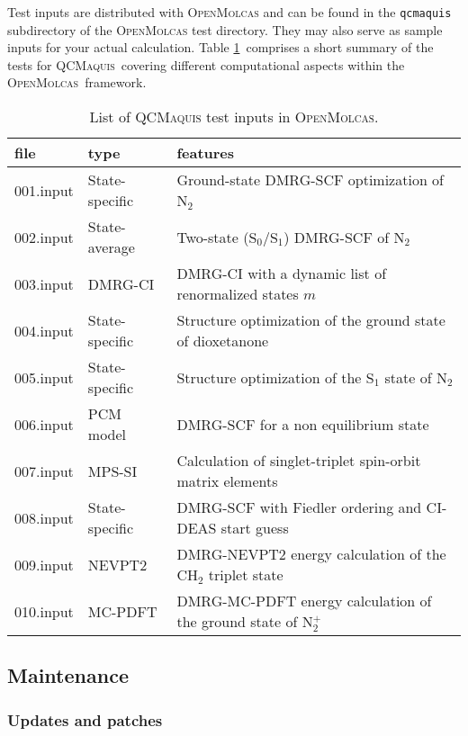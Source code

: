 \documentclass[bibliography=totoc,12pt,a4paper]{scrartcl}
\newcommand{\mol}{\textsc{OpenMolcas}}
\newcommand{\qcm}{\textsc{QCMaquis}}
\begin{document}
\noindent Test inputs are distributed with \mol{} and can be found in the \texttt{qcmaquis} subdirectory of the \mol{} test directory.
They may also serve as sample inputs for your actual calculation. 
Table \ref{tab:inputex}\ comprises a short summary of the tests for \qcm\ covering different computational aspects within the \mol\ framework.

\begin{table}
  \begin{tabular}{lll}
    \hline \hline
    file & type & features\\
    \hline
    001.input & State-specific & Ground-state DMRG-SCF optimization of N$_2$\\
    002.input & State-average  & Two-state (S$_0$/S$_1$) DMRG-SCF of N$_2$\\
    003.input & DMRG-CI        & DMRG-CI with a dynamic list of renormalized states $m$\\
    004.input & State-specific & Structure optimization of the ground state of dioxetanone\\
    005.input & State-specific & Structure optimization of the S$_1$ state of N$_2$\\
    006.input & PCM model      & DMRG-SCF for a non equilibrium state\\
    007.input & MPS-SI         & Calculation of singlet-triplet spin-orbit matrix elements\\
    008.input & State-specific & DMRG-SCF with Fiedler ordering and CI-DEAS start guess\\
    009.input & NEVPT2         & DMRG-NEVPT2 energy calculation of the CH$_2$ triplet state\\
    010.input & MC-PDFT        & DMRG-MC-PDFT energy calculation of the ground state of N$_2^+$\\
    \hline \hline
  \end{tabular}
  \caption{List of \qcm{} test inputs in \mol{}.}
  \label{tab:inputex}
\end{table}

\subsection{Maintenance}\label{sec:maintenance}

\subsubsection{Updates and patches}\label{sec:patches-qcm}
\end{document}
